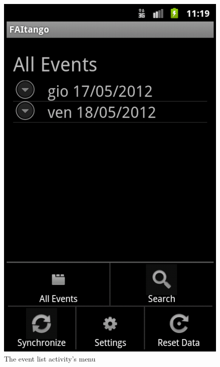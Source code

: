 \documentclass[12pt, twoside]{article}
\begin{document}
\begin{figure}[h]
\begin{center}
\includegraphics[scale=0.60]{fig/event-list-activity.png}
\end{center}
\caption{The event list activity's menu}
\label{fig:eventlistmenu}
\end{figure}
\end{document}
